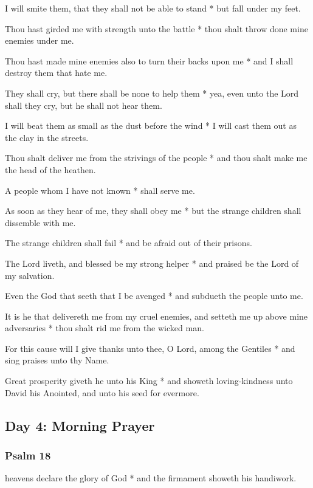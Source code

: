 I will smite them, that they shall not be able to stand * but fall under my feet.

Thou hast girded me with strength unto the battle * thou shalt throw done mine enemies under me.

Thou hast made mine enemies also to turn their backs upon me * and I shall destroy them that hate me.

They shall cry, but there shall be none to help them * yea, even unto the Lord shall they cry, but he shall not hear them.

I will beat them as small as the dust before the wind * I will cast them out as the clay in the streets.

Thou shalt deliver me from the strivings of the people * and thou shalt make me the head of the heathen.

A people whom I have not known * shall serve me.

As soon as they hear of me, they shall obey me * but the strange children shall dissemble with me.

The strange children shall fail * and be afraid out of their prisons.

The Lord liveth, and blessed be my strong helper * and praised be the Lord of my salvation.

Even the God that seeth that I be avenged * and subdueth the people unto me.

It is he that delivereth me from my cruel enemies, and setteth me up above mine adversaries * thou shalt rid me from the wicked man.

For this cause will I give thanks unto thee, O Lord, among the Gentiles * and sing praises unto thy Name.

Great prosperity giveth he unto his King * and showeth loving-kindness unto David his Anointed, and unto his seed for evermore.

\subsection{Day 4: Morning Prayer}

\subsubsection{Psalm 18}


 heavens declare the glory of God * and the firmament showeth his handiwork.

